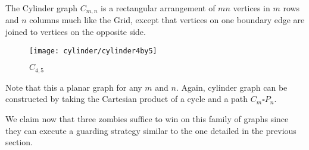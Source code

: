 
The Cylinder graph $C_{m,n}$ is a rectangular arrangement of $mn$ vertices in
$m$ rows and $n$ columns much like the Grid, except that vertices on one
boundary edge are joined to vertices on the opposite side.

\begin{figure}[h]
  \centering
  \texttt{[image: cylinder/cylinder4by5]}
  \caption{$C_{4,5}$}
\end{figure}

Note that this a planar graph for any $m$ and $n$. Again, cylinder graph can be constructed by taking the
Cartesian product of a cycle and a path $C_m \square P_n$.

We claim now that three zombies suffice to win on this family of graphs since they can execute
a guarding strategy similar to the one detailed in the previous section.

